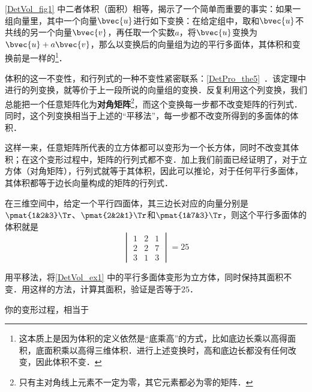 \autoref{DetVol_fig1} 中二者体积（面积）相等，揭示了一个简单而重要的事实：如果一组向量里，其中一个向量$\bvec{u}$进行如下变换：在给定组中，取和$\bvec{u}$不共线的另一个向量$\bvec{v}$，再任取一个实数$a$，将$\bvec{u}$变换为$\bvec{u}+a\bvec{v}$，那么以变换后的向量组为边的平行多面体，其体积和变换前是一样的\footnote{这本质上是因为体积的定义依然是“底乘高”的方式，比如底边长乘以高得面积，底面积乘以高得三维体积．进行上述变换时，高和底边长都没有任何改变，因此体积不变．}．

体积的这一不变性，和行列式的一种不变性紧密联系：\autoref{DetPro_the5}~．该定理中进行的列变换，就等价于上一段所说的向量组的变换．反复利用这个列变换，我们总能把一个任意矩阵化为\textbf{对角矩阵}\footnote{只有主对角线上元素不一定为零，其它元素都必为零的矩阵．}，而这个变换每一步都不改变矩阵的行列式．同时，这个列变换相当于上述的“平移法”，每一步都不改变所得到的多面体的体积．

这样一来，任意矩阵所代表的立方体都可以变形为一个长方体，同时不改变其体积；在这个变形过程中，矩阵的行列式都不变．加上我们前面已经证明了，对于立方体（对角矩阵），行列式就等于其体积，因此可以推论，对于任何平行多面体，其体积都等于边长向量构成的矩阵的行列式．

\begin{example}{}\label{DetVol_ex1}
在三维空间中，给定一个平行四面体，其三边长对应的向量分别是$\pmat{1&2&3}\Tr$、$\pmat{2&2&1}\Tr$和$\pmat{1&7&3}\Tr$，则这个平行多面体的体积就是
\begin{equation}
\begin{vmatrix}
1&2&1\\
2&2&7\\
3&1&3
\end{vmatrix} = 25
\end{equation}
\end{example}

\begin{exercise}{}
用平移法，将\autoref{DetVol_ex1} 中的平行多面体变形为立方体，同时保持其面积不变．用这样的方法，计算其面积，验证是否等于$25$．

你的变形过程，相当于
\end{exercise}







